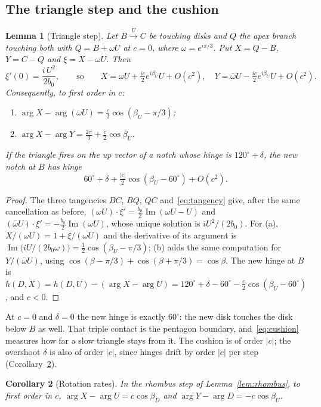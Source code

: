 \documentclass[11pt]{amsart}
\newtheorem{lemma}{Lemma}[section]
\newtheorem{corollary}[lemma]{Corollary}
\theoremstyle{definition}
\DeclareMathOperator{\Imag}{Im}
\begin{document}
\subsection{The triangle step and the cushion}
\begin{lemma}[Triangle step]\label{lem:triangle}
Let $B\xrightarrow{U}C$ be touching disks and $Q$ the apex branch touching both with $Q=B+\omega U$
at $c=0$, where $\omega=e^{i\pi/3}$. Put $X=Q-B$, $Y=C-Q$ and $\xi=X-\omega U$. Then
\[
\xi'(0)=\frac{i\,U^2}{2b_0},\qquad\text{so}\qquad X=\omega U+\tfrac{ic}{2}e^{i\beta_U}U+O(c^2),\quad
Y=\bar\omega U-\tfrac{ic}{2}e^{i\beta_U}U+O(c^2).
\]
Consequently, to first order in $c$:
\begin{enumerate}
\item[(a)] $\arg X-\arg(\omega U)=\tfrac c2\cos(\beta_U-\pi/3)$;
\item[(b)] $\arg X-\arg Y=\tfrac{2\pi}3+\tfrac c2\cos\beta_U$.
\end{enumerate}
If the triangle fires on the up vector of a notch whose hinge is $120^\circ+\delta$, the new notch at $B$
has hinge
\begin{equation}\label{eq:cushion}
60^\circ+\delta+\tfrac{|c|}{2}\cos(\beta_U-60^\circ)+O(c^2).
\end{equation}
\end{lemma}

\begin{proof}
The three tangencies $BC$, $BQ$, $QC$ and~\eqref{eq:tangency} give, after the same cancellation as before,
$(\omega U)\cdot\xi'=\tfrac{b_0}2\Imag(\omega U-U)$ and $(\bar\omega U)\cdot\xi'=-\tfrac{b_0}2\Imag(\omega U)$,
whose unique solution is $iU^2/(2b_0)$. For (a), $X/(\omega U)=1+\xi/(\omega U)$ and the derivative of its
argument is $\Imag\bigl(iU/(2b_0\omega)\bigr)=\tfrac12\cos(\beta_U-\pi/3)$; (b) adds the same computation for
$Y/(\bar\omega U)$, using $\cos(\beta-\pi/3)+\cos(\beta+\pi/3)=\cos\beta$. The new hinge at $B$ is
$h(D,X)=h(D,U)-(\arg X-\arg U)=120^\circ+\delta-60^\circ-\tfrac c2\cos(\beta_U-60^\circ)$, and $c<0$.
\end{proof}

At $c=0$ and $\delta=0$ the new hinge is exactly $60^\circ$: the new disk touches the disk below $B$ as
well. That triple contact is the pentagon boundary, and~\eqref{eq:cushion} measures how far a slow
triangle stays from it. The cushion is of order $|c|$; the overshoot $\delta$ is also of order $|c|$,
since hinges drift by order $|c|$ per step (Corollary~\ref{cor:rates}).

\begin{corollary}[Rotation rates]\label{cor:rates}
In the rhombus step of Lemma~\ref{lem:rhombus}, to first order in $c$,
$\arg X-\arg U=c\cos\beta_D$ and $\arg Y-\arg D=-c\cos\beta_U$.
\end{corollary}
\end{document}
